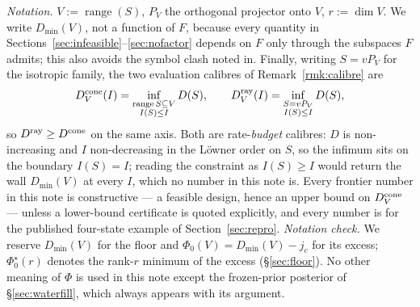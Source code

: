 \emph{Notation.} $V:=\operatorname{range}(S)$, $P_V$ the orthogonal projector
onto $V$, $r:=\dim V$. We write $D_{\min}(V)$, not a function of $F$, because
every quantity in Sections~\ref{sec:infeasible}--\ref{sec:nofactor} depends on
$F$ only through the subspaces $F$ admits; this also avoids the symbol clash
noted in. Finally, writing $S=vP_V$ for the isotropic
family, the two evaluation calibres of
Remark~\ref{rmk:calibre} are
\[
 D^{\rm cone}_{V}(I)=\inf_{\substack{\operatorname{range}S\subseteq V\\
 I(S)\le I}}D(S),\qquad
 D^{\rm ray}_{V}(I)=\inf_{\substack{S=vP_V\\ I(S)\le I}}D(S),
\]
so $D^{\rm ray}\ge D^{\rm cone}$ on the same axis. Both are rate-\emph{budget}
calibres: $D$ is non-increasing and $I$ non-decreasing in the L\"owner order on
$S$, so the infimum sits on the boundary $I(S)=I$; reading the constraint as
$I(S)\ge I$ would return the wall $D_{\min}(V)$ at every $I$, which no number in
this note is. Every frontier number in this
note is constructive --- a feasible design, hence an upper bound on
$D^{\rm cone}_{V}$ --- unless a lower-bound certificate is quoted explicitly, and
every number is for the published four-state example of
Section~\ref{sec:repro}. \emph{Notation check.} We reserve $D_{\min}(V)$ for the floor and
$\Phi_0(V)=D_{\min}(V)-j_c$ for its excess; $\Phi_0^{\star}(r)$ denotes the
rank-$r$ minimum of the excess (\S\ref{sec:floor}). No other meaning of $\Phi$
is used in this note except the frozen-prior posterior of
\S\ref{sec:waterfill}, which always appears with its argument.
